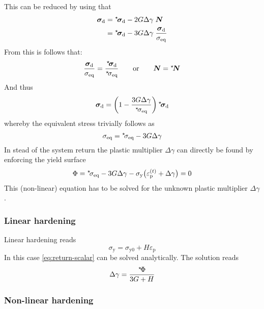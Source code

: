 \documentclass[times]{goose-article}
\newcommand\leftstar[1]{\hspace*{-.3em}~^\star\!#1}
\begin{document}
This can be reduced by using that
\begin{align}
  \bm{\sigma}_\mathrm{d}
  &= \leftstar{\bm{\sigma}}_\mathrm{d}
   - 2 G \Delta \gamma \; \bm{N}
  \\
  &= \leftstar{\bm{\sigma}}_\mathrm{d}
   - 3 G \Delta \gamma \;
   \frac{
     \bm{\sigma}_\mathrm{d}
   }{
     \sigma_\mathrm{eq}
   }
\end{align}
From this is follows that:
\begin{equation}
  \frac{\bm{\sigma}_\mathrm{d}}{\sigma_\mathrm{eq}}
  = \frac{\leftstar{\bm{\sigma}}_\mathrm{d}}{\leftstar{\sigma}_\mathrm{eq}}
  \qquad
  \text{or}
  \qquad
  \bm{N}
  = \leftstar{\bm{N}}
\end{equation}
And thus
\begin{equation}
  \bm{\sigma}_\mathrm{d}
  = \left( 1 - \frac{3 G \Delta \gamma}{\leftstar{\sigma}_\mathrm{eq}} \right)
    \leftstar{\bm{\sigma}}_\mathrm{d}
\end{equation}
whereby the equivalent stress trivially follows as
\begin{equation}
  \sigma_\mathrm{eq} =
  \leftstar{\sigma}_\mathrm{eq} - 3 G \Delta \gamma
\end{equation}
In stead of the system return the plastic multiplier $\Delta \gamma$ can directly be found by enforcing the yield surface
\begin{equation}
\label{eq:return-scalar}
  \Phi
  = \leftstar{\sigma}_\mathrm{eq}
  - 3 G \Delta \gamma
  - \sigma_\mathrm{y} \big( \varepsilon_\mathrm{p}^{(t)} + \Delta \gamma \big)
  = 0
\end{equation}
This (non-linear) equation has to be solved for the unknown plastic multiplier $\Delta \gamma$.

\subsubsection{Linear hardening}

Linear hardening reads
\begin{equation}
  \sigma_\mathrm{y} = \sigma_\mathrm{y0} + H \varepsilon_\mathrm{p}
\end{equation}
In this case \eqref{eq:return-scalar} can be solved analytically. The solution reads
\begin{equation}
  \Delta \gamma
  = \frac{ \leftstar{\Phi} }{ 3G + H }
\end{equation}

\subsubsection{Non-linear hardening}
\end{document}
